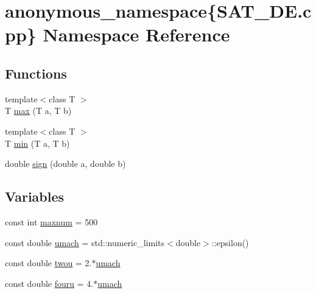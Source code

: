\hypertarget{namespaceanonymous__namespace_02SAT__DE_8cpp_03}{\section{anonymous\-\_\-namespace\{S\-A\-T\-\_\-\-D\-E.\-cpp\} Namespace Reference}
\label{namespaceanonymous__namespace_02SAT__DE_8cpp_03}
}
\subsection*{Functions}
\begin{DoxyCompactItemize}
\item 
{\footnotesize template$<$class T $>$ }\\T \hyperlink{namespaceanonymous__namespace_02SAT__DE_8cpp_03_a1f330d07aea9e972e8da7af294b10b94}{max} (T a, T b)
\item 
{\footnotesize template$<$class T $>$ }\\T \hyperlink{namespaceanonymous__namespace_02SAT__DE_8cpp_03_ae4ba4f69a40b68446f66e9f06a6df7c2}{min} (T a, T b)
\item 
double \hyperlink{namespaceanonymous__namespace_02SAT__DE_8cpp_03_aabcae428edea4adc1bad5b1f9e9eb684}{sign} (double a, double b)
\end{DoxyCompactItemize}
\subsection*{Variables}
\begin{DoxyCompactItemize}
\item 
const int \hyperlink{namespaceanonymous__namespace_02SAT__DE_8cpp_03_a0ed7041d585ca8647b8bff9a4d9d62e6}{maxnum} = 500
\item 
const double \hyperlink{namespaceanonymous__namespace_02SAT__DE_8cpp_03_af9ba43b60b8cf661784a1b5c2410045d}{umach} = std\-::numeric\-\_\-limits$<$double$>$\-::epsilon()
\item 
const double \hyperlink{namespaceanonymous__namespace_02SAT__DE_8cpp_03_ac7d697ccca057a8340590bebf83de9f7}{twou} = 2.$\ast$\hyperlink{namespaceanonymous__namespace_02SAT__DE_8cpp_03_af9ba43b60b8cf661784a1b5c2410045d}{umach}
\item 
const double \hyperlink{namespaceanonymous__namespace_02SAT__DE_8cpp_03_a5299ad0fd8f5e34ef1ef5a2e5acdaa2c}{fouru} = 4.$\ast$\hyperlink{namespaceanonymous__namespace_02SAT__DE_8cpp_03_af9ba43b60b8cf661784a1b5c2410045d}{umach}
\end{DoxyCompactItemize}


